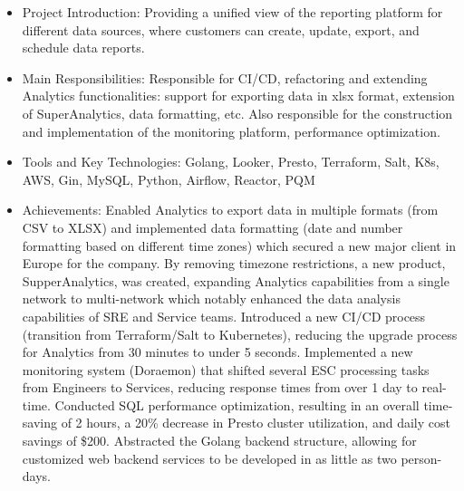 \documentclass{resume}
\begin{document}
\begin{itemize}
\item Project Introduction: Providing a unified view of the reporting platform for different data sources, where customers can create, update, export, and schedule data reports.
\item Main Responsibilities: Responsible for CI/CD, refactoring and extending Analytics functionalities: support for exporting data in xlsx format, extension of SuperAnalytics, data formatting, etc. Also responsible for the construction and implementation of the monitoring platform, performance optimization.
\item Tools and Key Technologies: Golang, Looker, Presto, Terraform, Salt, K8s, AWS, Gin, MySQL, Python, Airflow, Reactor, PQM
\item Achievements: Enabled Analytics to export data in multiple formats (from CSV to XLSX) and implemented data formatting (date and number formatting based on different time zones) which secured a new major client in Europe for the company. By removing timezone restrictions, a new product, SupperAnalytics, was created, expanding Analytics capabilities from a single network to multi-network which notably enhanced the data analysis capabilities of SRE and Service teams. Introduced a new CI/CD process (transition from Terraform/Salt to Kubernetes), reducing the upgrade process for Analytics from 30 minutes to under 5 seconds. Implemented a new monitoring system (Doraemon) that shifted several ESC processing tasks from Engineers to Services, reducing response times from over 1 day to real-time. Conducted SQL performance optimization, resulting in an overall time-saving of 2 hours, a 20\% decrease in Presto cluster utilization, and daily cost savings of \$200. Abstracted the Golang backend structure, allowing for customized web backend services to be developed in as little as two person-days.
\end{itemize}
\end{document}
